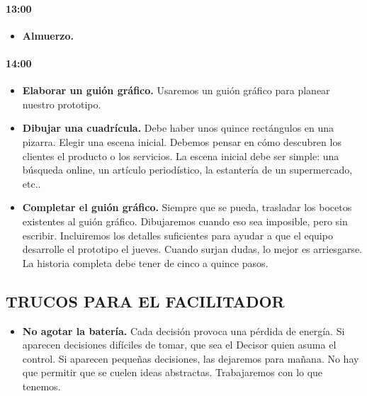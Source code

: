 \documentclass[10pt]{article}
\begin{document}
\begin{multicols}{2}
\paragraph{13:00}
\begin{itemize}
\item \textbf{Almuerzo.}
\end{itemize}
\paragraph{14:00}
\begin{itemize}
\item \textbf{Elaborar un guión gráfico.} Usaremos un guión gráfico para planear nuestro prototipo.
\item \textbf{Dibujar una cuadrícula.} Debe haber unos quince rectángulos en una pizarra. Elegir una escena inicial. Debemos pensar en cómo descubren los clientes el producto o los servicios. La escena inicial debe ser simple: una búsqueda online, un artículo periodístico, la estantería de un supermercado, etc..
\item \textbf{Completar el guión gráfico.} Siempre que se pueda, trasladar los bocetos existentes al guión gráfico. Dibujaremos cuando eso sea imposible, pero sin escribir. Incluiremos los detalles suficientes para ayudar a que el equipo desarrolle el prototipo el jueves. Cuando surjan dudas, lo mejor es arriesgarse. La historia completa debe tener de cinco a quince pasos.
\end{itemize}
\subsection*{TRUCOS PARA EL FACILITADOR}
\begin{itemize}
\item \textbf{No agotar la batería.} Cada decisión provoca una pérdida de energía. Si aparecen decisiones difíciles de tomar, que sea el Decisor quien asuma el control. Si aparecen pequeñas decisiones, las dejaremos para mañana. No hay que permitir que se cuelen ideas abstractas. Trabajaremos con lo que tenemos.
\end{itemize}
\end{multicols}
\end{document}
